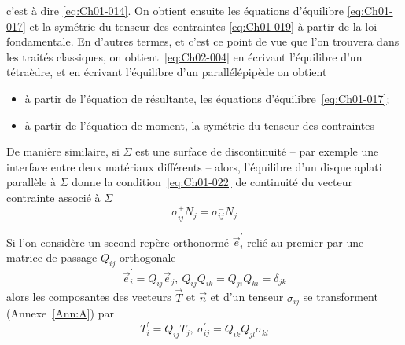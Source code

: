 c'est à dire \eqref{eq:Ch01-014}.
On obtient ensuite les équations d'équilibre \eqref{eq:Ch01-017} et la symétrie du tenseur des contraintes \eqref{eq:Ch01-019} à partir de la loi fondamentale. 
En d'autres termes, et c'est ce point de vue que l'on trouvera dans les traités classiques, on obtient~\eqref{eq:Ch02-004} en écrivant l'équilibre d'un tétraèdre, et en écrivant l'équilibre d'un parallélépipède on obtient 
\begin{itemize}
    \item à partir de l'équation de résultante, les équations d'équilibre~\eqref{eq:Ch01-017};
    \item à partir de l'équation de moment, la symétrie du tenseur des contraintes
\end{itemize}

De manière similaire, si $\Sigma$ est une surface de discontinuité -- par exemple une interface entre deux matériaux différents -- alors, l'équilibre d'un disque aplati parallèle à $\Sigma$ donne la condition~\eqref{eq:Ch01-022} de continuité du vecteur contrainte associé à $\Sigma$
\begin{equation}
    \sigma_{ij}^+ N_j = \sigma_{ij}^- N_j
    \label{eq:Ch02-005}
\end{equation}

Si l'on considère un second repère orthonormé $\vec{e}_i^{\prime}$ relié au premier par une matrice de passage $Q_{ij}$ orthogonale
\begin{equation}
    \vec{e}_i^{\prime} = Q_{ij} \vec{e}_j,\ Q_{ij}Q_{ik} = Q_{ji}Q_{ki} = \delta_{jk}
    \label{eq:Ch02-006}
\end{equation}
alors les composantes des vecteurs $\vec{T}$ et $\vec{n}$ et d'un tenseur $\sigma_{ij}$ se transforment (Annexe~\ref{Ann:A}) par
\begin{equation}
    T_i^{\prime} = Q_{ij} T_j,\ \sigma_{ij}^{\prime} = Q_{ik}Q_{jl} \sigma_{kl}
    \label{eq:Ch02-007}
\end{equation}

